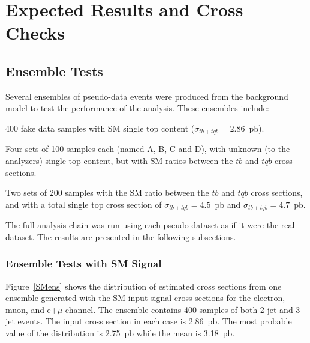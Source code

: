 \chapter{Expected Results and Cross Checks}

\section{Ensemble Tests}
\label{sec:ensembles}

Several ensembles of pseudo-data events were produced from the
background model to test the performance of the analysis. These
ensembles include:
\vspace{-0.05in}
\begin{myenumerate}
\item 400 fake data samples with SM single top content
($\sigma_{tb+tqb}=2.86$~pb).
\item Four sets of 100 samples each (named A, B, C and D), with
unknown (to the analyzers) single top content, but with SM ratios
between the $tb$ and $tqb$ cross sections.
\item Two sets of 200 samples with the SM ratio between the $tb$ and
$tqb$ cross sections, and with a total single top cross section of
$\sigma_{tb+tqb}=4.5$~pb and $\sigma_{tb+tqb}=4.7$~pb.
\end{myenumerate}
\vspace{-0.05in}
The full analysis chain was run using each pseudo-dataset as if it
were the real dataset. The results are presented in the following
subsections.

\subsection{Ensemble Tests with SM Signal}
\label{ens_SM_sig}

Figure~\ref{SMens} shows the distribution of estimated cross sections
from one ensemble generated with the SM input signal cross sections
for the electron, muon, and e+$\mu$ channel. The ensemble contains 400
samples of both 2-jet and 3-jet events. The input cross section in
each case is 2.86~pb. The most probable value of the distribution is
2.75~pb while the mean is 3.18~pb.

